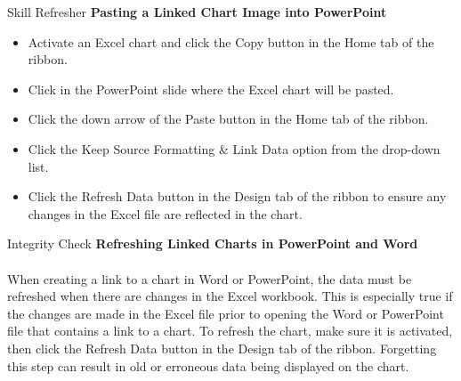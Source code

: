 \begin{center}
	\begin{sklbox}{Skill Refresher}
		\textbf{Pasting a Linked Chart Image into PowerPoint}
		\\
		\begin{itemize}
			\setlength{\itemsep}{0pt}
			\setlength{\parskip}{0pt}
			\setlength{\parsep}{0pt}
			
			\item Activate an Excel chart and click the Copy button in the Home tab of the ribbon.
			\item Click in the PowerPoint slide where the Excel chart will be pasted.
			\item Click the down arrow of the Paste button in the Home tab of the ribbon.
			\item Click the Keep Source Formatting \& Link Data option from the drop-down list.
			\item Click the Refresh Data button in the Design tab of the ribbon to ensure any changes in the Excel file are reflected in the chart.
			
		\end{itemize}
	\end{sklbox}
\end{center}

\begin{center}
	\begin{infobox}{Integrity Check}
		\textbf{Refreshing Linked Charts in PowerPoint and Word}
		\\
		\\
		When creating a link to a chart in Word or PowerPoint, the data must be refreshed when there are changes in the Excel workbook. This is especially true if the changes are made in the Excel file prior to opening the Word or PowerPoint file that contains a link to a chart. To refresh the chart, make sure it is activated, then click the Refresh Data button in the Design tab of the ribbon. Forgetting this step can result in old or erroneous data being displayed on the chart.
	\end{infobox}
\end{center}



